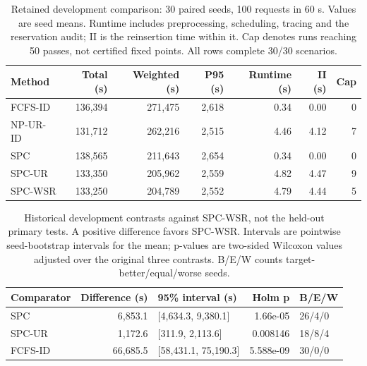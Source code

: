 \begin{table}[!htbp]
\caption{Retained development comparison: 30 paired seeds, 100 requests in 60 s. Values are seed means. Runtime includes preprocessing, scheduling, tracing and the reservation audit; II is the reinsertion time within it. Cap denotes runs reaching 50 passes, not certified fixed points. All rows complete 30/30 scenarios.}\label{tab:main}
\centering\small
\begin{tabularx}{\textwidth}{L R R R R R r}
\toprule
Method & Total (s) & Weighted (s) & P95 (s) & Runtime (s) & II (s) & Cap \\
\midrule
FCFS-ID & 136,394 & 271,475 & 2,618 & 0.34 & 0.00 & 0 \\
NP-UR-ID & 131,712 & 262,216 & 2,515 & 4.46 & 4.12 & 7 \\
SPC & 138,565 & 211,643 & 2,654 & 0.34 & 0.00 & 0 \\
SPC-UR & 133,350 & 205,962 & 2,559 & 4.82 & 4.47 & 9 \\
SPC-WSR & 133,250 & 204,789 & 2,552 & 4.79 & 4.44 & 5 \\
\bottomrule
\end{tabularx}
\end{table}
\begin{table}[!htbp]
\caption{Historical development contrasts against SPC-WSR, not the held-out primary tests. A positive difference favors SPC-WSR. Intervals are pointwise seed-bootstrap intervals for the mean; p-values are two-sided Wilcoxon values adjusted over the original three contrasts. B/E/W counts target-better/equal/worse seeds.}\label{tab:primary}
\centering\small
\begin{tabularx}{\textwidth}{L R L R l}
\toprule
Comparator & Difference (s) & 95\% interval (s) & Holm p & B/E/W \\
\midrule
SPC & 6,853.1 & [4,634.3, 9,380.1] & 1.66e-05 & 26/4/0 \\
SPC-UR & 1,172.6 & [311.9, 2,113.6] & 0.008146 & 18/8/4 \\
FCFS-ID & 66,685.5 & [58,431.1, 75,190.3] & 5.588e-09 & 30/0/0 \\
\bottomrule
\end{tabularx}
\end{table}
